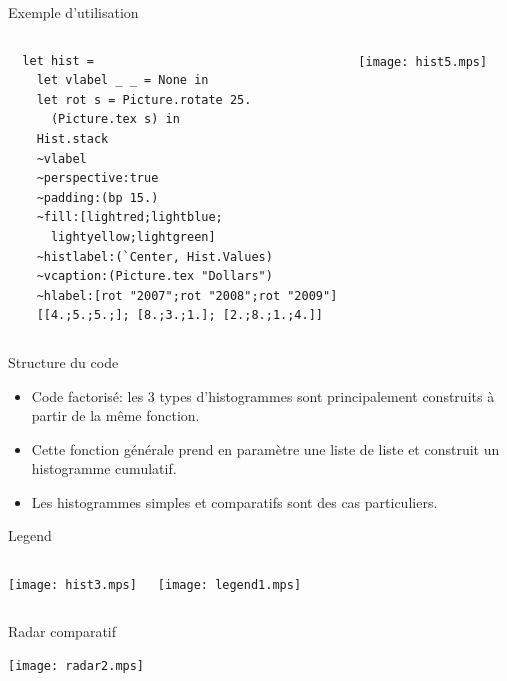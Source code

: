 \documentclass{beamer}
\begin{document}
\begin{frame}[fragile]{Exemple d'utilisation}
\begin{columns}
  \begin{center}\footnotesize{
\begin{verbatim}
  let hist =
    let vlabel _ _ = None in
    let rot s = Picture.rotate 25. 
      (Picture.tex s) in
    Hist.stack
    ~vlabel
    ~perspective:true 
    ~padding:(bp 15.)
    ~fill:[lightred;lightblue;
      lightyellow;lightgreen]
    ~histlabel:(`Center, Hist.Values)
    ~vcaption:(Picture.tex "Dollars")
    ~hlabel:[rot "2007";rot "2008";rot "2009"]
    [[4.;5.;5.;]; [8.;3.;1.]; [2.;8.;1.;4.]]
\end{verbatim}}
      \end{center}
    
    \begin{center}
      \texttt{[image: hist5.mps]}
    \end{center}
  \end{columns}
\end{frame}
    
\begin{frame}{Structure du code}
  \begin{itemize}
  \item Code factorisé: les 3 types d'histogrammes sont principalement construits à partir de la même fonction.
  
  \bigskip
  \item Cette fonction générale prend en paramètre une liste de liste et construit un histogramme cumulatif.
  
  \bigskip
  \item Les histogrammes simples et comparatifs sont des cas particuliers.
  \end{itemize}
\end{frame}


\begin{frame}{Legend}
  \begin{columns}
    \begin{center}
      \texttt{[image: hist3.mps]}
    \end{center}
     \texttt{[image: legend1.mps]}
  \end{columns}
\end{frame}

\begin{frame}{Radar comparatif}
  \begin{center}
    \texttt{[image: radar2.mps]}
  \end{center}
\end{frame}
\end{document}

